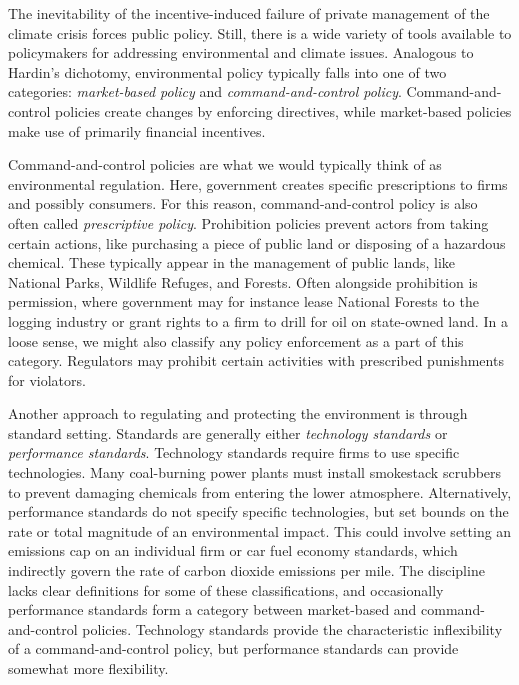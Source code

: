 The inevitability of the incentive-induced failure of private management of the climate crisis forces public policy. Still, there is a wide variety of tools available to policymakers for addressing environmental and climate issues. 
Analogous to Hardin's dichotomy, environmental policy typically falls into one of two categories: \emph{market-based policy} and \emph{command-and-control policy}. Command-and-control policies create changes by enforcing directives, while market-based policies make use of primarily financial incentives.






Command-and-control policies are what we would typically think of as environmental regulation. Here, government creates specific prescriptions to firms and possibly consumers. For this reason, command-and-control policy is also often called \emph{prescriptive policy}. Prohibition policies prevent actors from taking certain actions, like purchasing a piece of public land or disposing of a hazardous chemical. These typically appear in the management of public lands, like National Parks, Wildlife Refuges, and Forests. Often alongside prohibition is permission, where government may for instance lease National Forests to the logging industry or grant rights to a firm to drill for oil on state-owned land. In a loose sense, we might also classify any policy enforcement as a part of this category. Regulators may prohibit certain activities with prescribed punishments for violators. 

Another approach to regulating and protecting the environment is through standard setting. Standards are generally either \emph{technology standards} or \emph{performance standards}. Technology standards require firms to use specific technologies. Many coal-burning power plants must install smokestack scrubbers to prevent damaging chemicals from entering the lower atmosphere. Alternatively, performance standards do not specify specific technologies, but set bounds on the rate or total magnitude of an environmental impact. This could involve setting an emissions cap on an individual firm or car fuel economy standards, which indirectly govern the rate of carbon dioxide emissions per mile. The discipline lacks clear definitions for some of these classifications, and occasionally performance standards form a category between market-based and command-and-control policies. Technology standards provide the characteristic inflexibility of a command-and-control policy, but performance standards can provide somewhat more flexibility. 

